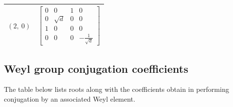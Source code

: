 \documentclass[11pt]{article}
\theoremstyle{definition}
\begin{document}
\begin{longtable}{|l|c|}
    \hline
    $\left( 2, \  0\right)$ & ${\left[\begin{matrix}0 & 0 & 1 & 0\\0 & \sqrt{d} & 0 & 0\\1 & 0 & 0 & 0\\0 & 0 & 0 & - \frac{1}{\sqrt{d}}\end{matrix}\right]}$ \\
    \hline
\end{longtable}


\subsection{Weyl group conjugation coefficients}

The table below lists roots along with the coefficients obtain in performing conjugation by an associated Weyl element.

\bigskip
\end{document}
